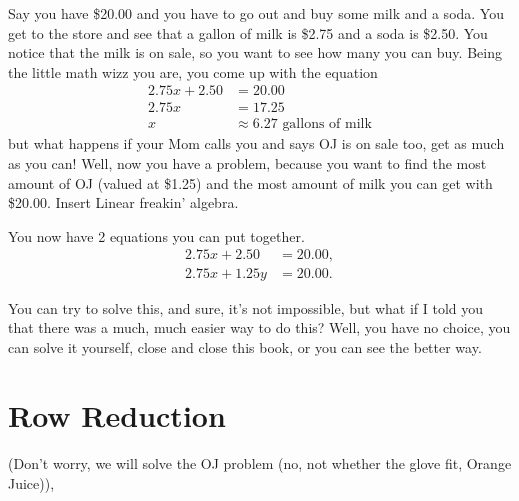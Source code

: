 Say you have \$20.00 and you have to go out and buy some milk and a soda. You get to the store and
see that a gallon of milk is \$2.75 and a soda is \$2.50. You notice that the milk is on sale, so you want to see how many you can buy. Being the little math wizz you are, you come up with the equation
\begin{equation}
    \begin{split}
    2.75x + 2.50 &= 20.00 \\
    2.75x &= 17.25 \\
    x & \approx 6.27 \text{ gallons of milk}
    \end{split}
\end{equation}
but what happens if your Mom calls you and says OJ is on sale too, get as much as you can!
Well, now you have a problem, because you want to find the most amount of OJ (valued at \$1.25) and the most amount
of milk you can get with \$20.00. Insert Linear freakin' algebra.

You now have 2 equations you can put together.
\begin{equation}
    \begin{split}
        2.75x + 2.50 &= 20.00, \\
        2.75x + 1.25y &= 20.00.
    \end{split}
\end{equation}

You can try to solve this, and sure, it's not impossible, but what if I told you that
there was a much, much easier way to do this? Well, you have no choice, you can solve it yourself,
close and close this book, or you can see the better way.

\section{Row Reduction}
(Don't worry, we will solve the OJ problem (no, not whether the glove fit, Orange Juice)),


